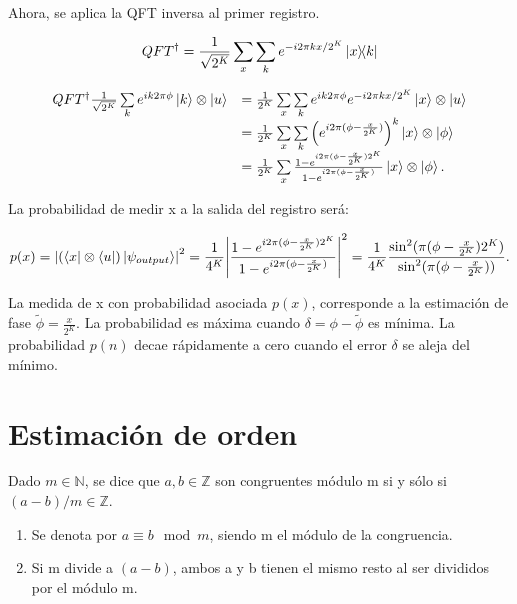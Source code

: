 Ahora, se aplica la QFT inversa al primer registro.

\begin{equation}
    QFT^\dagger = \frac{1}{\sqrt{2^K}} \sum\limits_x\sum\limits_k e^{-i 2\pi k x / 2^K} \ketbra{x}{k}
\end{equation}

\begin{equation}
\begin{array}{r l}
    QFT^\dagger \frac{1}{\sqrt{2^K}} \sum\limits_k e^{i k 2\pi \phi} \ket{k} \otimes \ket{u} &= \frac{1}{2^K} \sum\limits_x \sum\limits_k e^{i k 2\pi \phi} e^{-i 2\pi k x / 2^K} \ket{x} \otimes \ket{u} \\
    &= \frac{1}{2^K} \sum\limits_x\sum\limits_k \left(e^{i 2\pi (\phi - \frac{x}{2^K})}\right)^k \ket{x} \otimes \ket{\phi} \\
    &= \frac{1}{2^K} \sum\limits_x \frac{1 - e^{i 2\pi (\phi - \frac{x}{2^K}) 2^K}}{1 - e^{i 2\pi (\phi - \frac{x}{2^K})}} \ket{x} \otimes \ket{\phi} .
\end{array}
\end{equation}

La probabilidad de medir x a la salida del registro será:

\begin{equation}
    p(x) = \abs{(\bra{x} \otimes \bra{u}) \ket{\psi_{output}}}^2 = \frac{1}{4^K} \abs{\frac{1 - e^{i 2\pi (\phi - \frac{x}{2^K})2^K}}{1 - e^{i 2\pi (\phi - \frac{x}{2^K})}}}^2 = \frac{1}{4^{K}} \frac{\sin^2(\pi (\phi - \frac{x}{2^K}) 2^K)}{\sin^2(\pi (\phi - \frac{x}{2^K}))} .
\end{equation}

La medida de x con probabilidad asociada $p(x)$, corresponde a la estimación de fase $\tilde{\phi} = \frac{x}{2^K}$. La probabilidad es máxima cuando $\delta = \phi - \tilde{\phi}$ es mínima. La probabilidad $p(n)$ decae rápidamente a cero cuando el error $\delta$ se aleja del mínimo.

\section{Estimación de orden}

Dado $m \in \mathds{N}$, se dice que $a,b \in \mathds{Z}$ son congruentes módulo m si y sólo si $(a-b)/m \in \mathds{Z}$.

\begin{enumerate}
    \item Se denota por $a \equiv b \mod m$, siendo m el módulo de la congruencia.
    \item Si m divide a $(a-b)$, ambos a y b tienen el mismo resto al ser divididos por el módulo m.
\end{enumerate}

